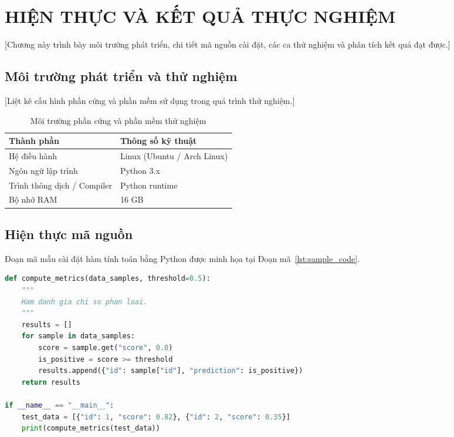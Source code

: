 \chapter{HIỆN THỰC VÀ KẾT QUẢ THỰC NGHIỆM}
\label{chap:implementation}

[Chương này trình bày môi trường phát triển, chi tiết mã nguồn cài đặt, các ca thử nghiệm và phân tích kết quả đạt được.]

\section{Môi trường phát triển và thử nghiệm}
\label{sec:environment}

[Liệt kê cấu hình phần cứng và phần mềm sử dụng trong quá trình thử nghiệm.]

\begin{table}[H]
    \centering
    \caption{Môi trường phần cứng và phần mềm thử nghiệm}
    \label{tab:sample_env}
    \begin{tabular}{|l|l|}
        \hline
        \textbf{Thành phần} & \textbf{Thông số kỹ thuật} \\ \hline
        Hệ điều hành & Linux (Ubuntu / Arch Linux) \\ \hline
        Ngôn ngữ lập trình & Python 3.x \\ \hline
        Trình thông dịch / Compiler & Python runtime \\ \hline
        Bộ nhớ RAM & 16 GB \\ \hline
    \end{tabular}
\end{table}

\section{Hiện thực mã nguồn}
\label{sec:code_details}

Đoạn mã mẫu cài đặt hàm tính toán bằng Python được minh họa tại Đoạn mã~\ref{lst:sample_code}.

\begin{lstlisting}[language=Python, caption={Đoạn mã minh họa thuật toán xử lý}, label={lst:sample_code}]
def compute_metrics(data_samples, threshold=0.5):
    """
    Ham danh gia chi so phan loai.
    """
    results = []
    for sample in data_samples:
        score = sample.get("score", 0.0)
        is_positive = score >= threshold
        results.append({"id": sample["id"], "prediction": is_positive})
    return results

if __name__ == "__main__":
    test_data = [{"id": 1, "score": 0.82}, {"id": 2, "score": 0.35}]
    print(compute_metrics(test_data))
\end{lstlisting}

